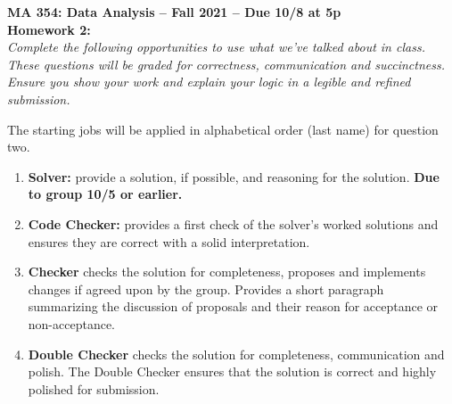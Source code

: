 \documentclass{article}\usepackage[]{graphicx}\usepackage[]{color}
\begin{document}
\noindent \textbf{MA 354: Data Analysis -- Fall 2021 -- Due 10/8 at 5p}\\%
\noindent \textbf{Homework 2:}\vspace{1em}\\
\emph{Complete the following opportunities to use what we've talked about in class. These questions will be graded for correctness, communication and succinctness. Ensure you show your work and explain your logic in a legible and refined submission.}\\\vspace{1em}

The starting jobs will be applied in alphabetical order (last name) for question two.
\begin{enumerate}
  \item \textbf{Solver:} provide a solution, if possible, and reasoning for the solution. \textbf{Due to group 10/5 or earlier.}
  \item \textbf{Code Checker:} provides a first check of the solver's worked solutions and ensures they are correct with a solid interpretation. 
  \item \textbf{Checker} checks the solution for completeness, proposes and implements changes if agreed upon by the group. Provides a short paragraph summarizing the discussion of proposals and their reason for acceptance or non-acceptance.
  \item \textbf{Double Checker} checks the solution for completeness, communication and polish. The Double Checker ensures that the solution is correct and highly polished for submission.
\end{enumerate}
\end{document}

